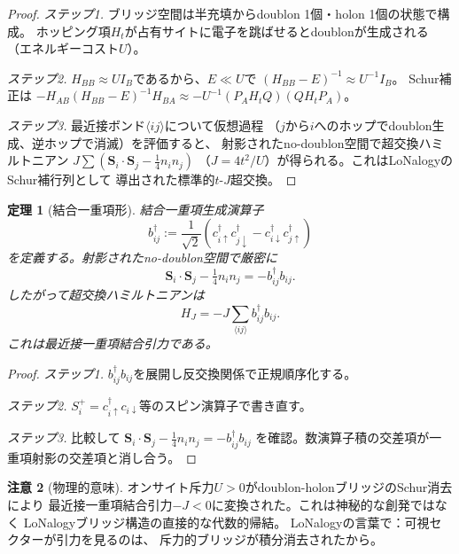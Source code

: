 \documentclass[12pt]{article}
\theoremstyle{plain}
\newtheorem{theorem}{定理}[section]
\theoremstyle{definition}
\newtheorem{remark}[theorem]{注意}
\numberwithin{equation}{section}
\begin{document}
\begin{proof}
\emph{ステップ1.}
ブリッジ空間は半充填からdoublon 1個・holon 1個の状態で構成。
ホッピング項$H_t$が占有サイトに電子を跳ばせるとdoublonが生成される
（エネルギーコスト$U$）。

\emph{ステップ2.}
$H_{BB}\approx UI_B$であるから、$E\ll U$で
$(H_{BB}-E)^{-1}\approx U^{-1}I_B$。
Schur補正は
$-H_{AB}(H_{BB}-E)^{-1}H_{BA}
\approx -U^{-1}(P_AH_tQ)(QH_tP_A)$。

\emph{ステップ3.}
最近接ボンド$\langle ij\rangle$について仮想過程
（$j$から$i$へのホップでdoublon生成、逆ホップで消滅）を評価すると、
射影されたno-doublon空間で超交換ハミルトニアン
$J\sum(\bm{S}_i\cdot\bm{S}_j-\frac{1}{4}n_in_j)$
（$J=4t^2/U$）が得られる。これはLoNalogyのSchur補行列として
導出された標準的$t$-$J$超交換。
\end{proof}

\begin{theorem}[結合一重項形]\label{thm:bondsinglet}
結合一重項生成演算子
\begin{equation}
b_{ij}^\dagger := \frac{1}{\sqrt{2}}
(c_{i\uparrow}^\dagger c_{j\downarrow}^\dagger
- c_{i\downarrow}^\dagger c_{j\uparrow}^\dagger)
\end{equation}
を定義する。射影されたno-doublon空間で厳密に
\begin{equation}
\bm{S}_i\cdot\bm{S}_j - \tfrac{1}{4}n_in_j
= -b_{ij}^\dagger b_{ij}.
\end{equation}
したがって超交換ハミルトニアンは
\begin{equation}
\boxed{H_J = -J\sum_{\langle ij\rangle}b_{ij}^\dagger b_{ij}.}
\end{equation}
これは最近接一重項結合\emph{引力}である。
\end{theorem}

\begin{proof}
\emph{ステップ1.}
$b_{ij}^\dagger b_{ij}$を展開し反交換関係で正規順序化する。

\emph{ステップ2.}
$S_i^+=c_{i\uparrow}^\dagger c_{i\downarrow}$等のスピン演算子で書き直す。

\emph{ステップ3.}
比較して
$\bm{S}_i\cdot\bm{S}_j-\frac{1}{4}n_in_j=-b_{ij}^\dagger b_{ij}$
を確認。数演算子積の交差項が一重項射影の交差項と消し合う。
\end{proof}

\begin{remark}[物理的意味]
オンサイト斥力$U>0$がdoublon-holonブリッジのSchur消去により
最近接一重項結合引力$-J<0$に変換された。これは神秘的な創発ではなく
LoNalogyブリッジ構造の直接的な代数的帰結。
LoNalogyの言葉で：可視セクターが引力を見るのは、
斥力的ブリッジが積分消去されたから。
\end{remark}
\end{document}
